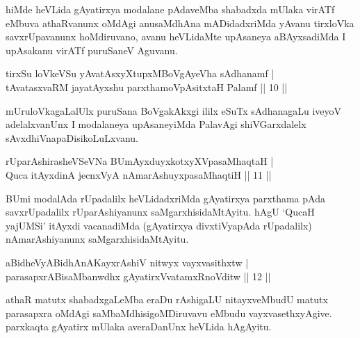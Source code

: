 \begin{artha} 
hiMde heVLida gAyatirxya modalane pAdaveMba shabadxda mUlaka virATf 
eMbuva athaRvanunx oMdAgi anusaMdhAna mADidadxriMda yAvanu tirxloVka 
savxrUpavanunx hoMdiruvano, avanu heVLidaMte upAsaneya aBAyxsadiMda I 
upAsakanu virATf puruSaneV Aguvanu.
\end{artha}


\begin{shl}
tirxSu loVkeVSu yAvatAsxyXtupxMBoVgAyeVha sAdhanamf  | \\
tAvatasxvaRM jayatAyxshu parxthamoVpAsitxtaH Palamf \hfill ||  10 ||
\end{shl}

\begin{artha} 
mUruloVkagaLalUlx puruSana BoVgakAkxgi ililx eSuTx sAdhanagaLu iveyoV 
adelalxvanUnx I modalaneya upAsaneyiMda PalavAgi shiVGarxdalelx 
sAvxdhiVnapaDisikoLuLxvanu.
\end{artha}


\begin{shl}
rUparAshirasheVSeVNa BUmAyxduyxkotxyXVpasaMhaqtaH | \\
Quca itAyxdinA jecnxVyA nAmarAshuyxpasaMhaqtiH \hfill ||  11 || 
\end{shl}

\begin{artha} 
BUmi modalAda rUpadalilx heVLidadxriMda gAyatirxya parxthama pAda 
savxrUpadalilx rUparAshiyanunx saMgarxhisidaMtAyitu. hAgU `QucaH 
yajUMSi' itAyxdi vacanadiMda (gAyatirxya divxtiVyapAda rUpadalilx) 
nAmarAshiyanunx saMgarxhisidaMtAyitu.
\end{artha}


\begin{shl}
\footnotetext[1]{}aBidheVyABidhAnAKayxrAshiV nitwyx vayxvasithxtw | \\
parasapxrABisaMbanwdhx gAyatirxVvatamxRnoVditw \hfill ||  12 ||
\end{shl}

\begin{artha} 
athaR matutx shabadxgaLeMba eraDu rAshigaLU nitayxveMbudU matutx 
parasapxra oMdAgi saMbaMdhisigoMDiruvavu eMbudu vayxvasethxyAgive. 
parxkaqta gAyatirx mUlaka averaDanUnx heVLida hAgAyitu.
\end{artha}

